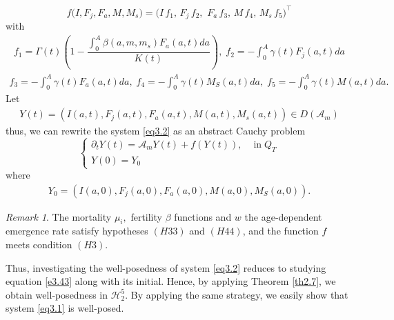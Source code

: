 \documentclass[10pt, a4paper]{amsart}
\theoremstyle{plain}
\theoremstyle{definition}
\theoremstyle{remark}
\newtheorem{remark}[lemma]{Remark}
\numberwithin{equation}{section}
\begin{document}
 $$
  f\bigl(I,F_j,F_a,M,M_s\bigr)
  = \bigl(I\,f_1,\,F_j\,f_2,\,\,F_a\,f_3,\,M\,f_4,\,M_s\,f_5\bigr)^\top
$$
with 
\begin{align}\label{e3.40}
f_1=\Gamma(t)\left(1-\dfrac{\displaystyle\int_{0}^A\beta(a,m,m_s) F_a(a,t)da}{K(t)}\right),\; f_2=-\displaystyle\int_{0}^A\gamma(t) F_j(a,t)da
\end{align}
\begin{align}\label{e3.41}
f_3=-\displaystyle\int_{0}^A\gamma(t)F_a(a,t)da,\;f_4=-\displaystyle\int_{0}^A\gamma(t) M_S(a,t)da,\; f_5=-\displaystyle\int_{0}^A\gamma(t) M(a,t)da.
\end{align}
Let 
\begin{align}\label{e3.42}
    Y(t)=\left( I(a,t), F_j(a,t), F_a(a,t),  M(a,t), M_s(a,t)\right)\in D(\mathcal{A}_m)
\end{align}
thus, we can rewrite the system \eqref{eq3.2} as an abstract Cauchy problem
\begin{equation}\label{e3.43}
\left\lbrace 
\begin{array}{ll}
\partial_tY(t)=\mathcal{A}_mY(t)+f(Y(t)),&\text{ in}\;Q_T\\
Y(0)=Y_0
\end{array}
\right.
\end{equation} 
where
\begin{align}
    Y_0=\left(I(a,0), F_j(a,0), F_a(a,0),  M(a,0), M_S(a,0)\right).
\end{align}
\begin{remark}
The mortality $\mu_i,$ fertility $\beta$ functions  and $w$ the age‑dependent emergence rate  satisfy hypotheses $(H33)$ and $(H44)$, and the function $f$ meets condition $(H3)$.
\end{remark}
Thus, investigating the well-posedness of system \eqref{eq3.2} reduces to studying equation \eqref{e3.43} along with its initial.  Hence, by applying Theorem \ref{th2.7}, we obtain well‑posedness in \( \mathcal{H}^5_2 \). By applying the same strategy, we easily show that system \eqref{eq3.1} is well-posed.
\end{document}
